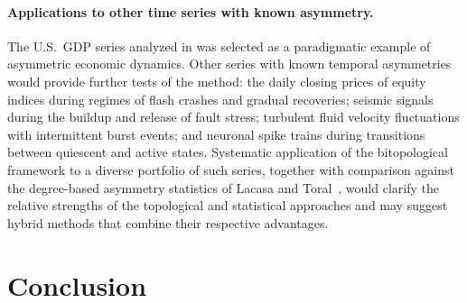 \documentclass[11pt,a4paper]{article}
\theoremstyle{plain}
\theoremstyle{definition}
\begin{document}
\paragraph{Applications to other time series with known asymmetry.}
The U.S.\ GDP series analyzed in  was selected as
a paradigmatic example of asymmetric economic dynamics. Other series
with known temporal asymmetries would provide further tests of the
method: the daily closing prices of equity indices during regimes of
flash crashes and gradual recoveries; seismic signals during the
buildup and release of fault stress; turbulent fluid velocity
fluctuations with intermittent burst events; and neuronal spike
trains during transitions between quiescent and active states.
Systematic application of the bitopological framework to a diverse
portfolio of such series, together with comparison against the
degree-based asymmetry statistics of Lacasa and
Toral~\cite{LacasaToral2010}, would clarify the relative strengths of
the topological and statistical approaches and may suggest hybrid
methods that combine their respective advantages.

\section{Conclusion}\label{sec:conclusion}
\end{document}
